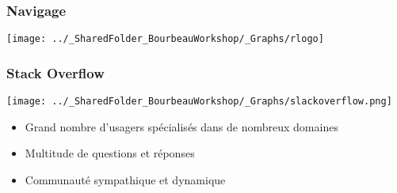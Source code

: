 \documentclass{beamer}
\begin{document}

    \begin{frame}
    
      \frametitle{Navigage} \vspace{1cm}
      
          \begin{center}
          
        \texttt{[image: ../\_SharedFolder\_BourbeauWorkshop/\_Graphs/rlogo]}

          \end{center}
          
    \end{frame}


    \begin{frame}
    
      \frametitle{Stack Overflow} \vspace{1cm}
      
        \begin{center}
          
        \texttt{[image: ../\_SharedFolder\_BourbeauWorkshop/\_Graphs/slackoverflow.png]}

         \end{center}
          
        \begin{itemize}
         \item Grand nombre d'usagers spécialisés dans de nombreux domaines
         \item Multitude de questions et réponses
         \item Communauté sympathique et dynamique
            
        \end{itemize}
          
    \end{frame}

\end{document}

